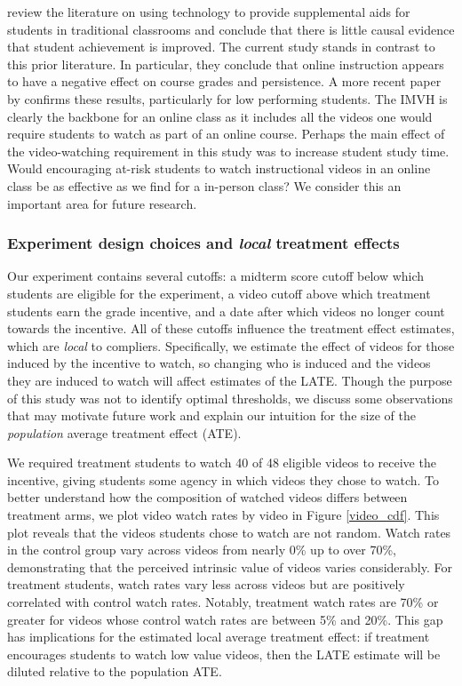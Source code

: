 \documentclass[12pt]{article}
\begin{document}
\textcite{aws2015} review the literature on using technology to provide supplemental aids for students in traditional classrooms and conclude that there is little causal evidence that student achievement is improved. The current study stands in contrast to this prior literature. In particular, they conclude that online instruction appears to have a negative effect on course grades and persistence. A more recent paper by \textcite{bflt2017} confirms these results, particularly for low performing students. The IMVH is clearly the backbone for an online class as it includes all the videos one would require students to watch as part of an online course. Perhaps the main effect of the video-watching requirement in this study was to increase student study time. Would encouraging at-risk students to watch instructional videos in an online class be as effective as we find for a in-person class? We consider this an important area for future research.

\subsubsection{Experiment design choices and \textit{local} treatment effects}

Our experiment contains several cutoffs: a midterm score cutoff below which students are eligible for the experiment, a video cutoff above which treatment students earn the grade incentive, and a date after which videos no longer count towards the incentive. All of these cutoffs influence the treatment effect estimates, which are \textit{local} to compliers. Specifically, we estimate the effect of videos for those induced by the incentive to watch, so changing who is induced and the videos they are induced to watch will affect estimates of the LATE. Though the purpose of this study was not to identify optimal thresholds, we discuss some observations that may motivate future work and explain our intuition for the size of the \textit{population} average treatment effect (ATE).

We required treatment students to watch 40 of 48 eligible videos to receive the incentive, giving students some agency in which videos they chose to watch. To better understand how the composition of watched videos differs between treatment arms, we plot video watch rates by video in Figure \ref{video_cdf}. This plot reveals that the videos students chose to watch are not random. Watch rates in the control group vary across videos from nearly 0\% up to over 70\%, demonstrating that the perceived intrinsic value of videos varies considerably. For treatment students, watch rates vary less across videos but are positively correlated with control watch rates. Notably, treatment watch rates are 70\% or greater for videos whose control watch rates are between 5\% and 20\%. This gap has implications for the estimated local average treatment effect: if treatment encourages students to watch low value videos, then the LATE estimate will be diluted relative to the population ATE.
\end{document}
